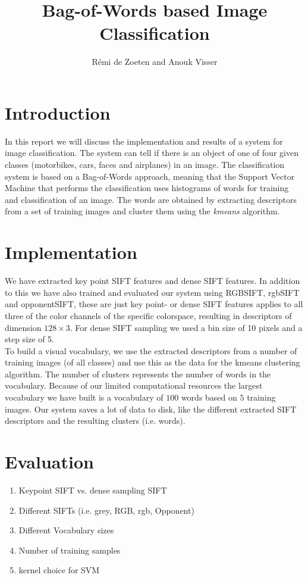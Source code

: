 \documentclass[11pt]{article}
\title{Bag-of-Words based Image Classification}
\author{R\'emi de Zoeten and Anouk Visser}
\begin{document}
\maketitle
\section{Introduction}
In this report we will discuss the implementation and results of a system for image classification. The system can tell if there is an object of one of four given classes (motorbikes, cars, faces and airplanes) in an image. The classification system is based on a Bag-of-Words approach, meaning that the Support Vector Machine that performs the classification uses histograms of words for training and classification of an image. The words are obtained by extracting descriptors from a set of training images and cluster them using the \textit{kmeans} algorithm.  

\section{Implementation}
We have extracted key point SIFT features and dense SIFT features. In addition to this we have also trained and evaluated our system using RGBSIFT, rgbSIFT and opponentSIFT, these are just key point- or dense SIFT features applies to all three of the color channels of the specific colorspace, resulting in descriptors of dimension $128\times3$. For dense SIFT sampling we used a bin size of 10 pixels and a step size of 5. \\
To build a visual vocabulary, we use the extracted descriptors from a number of training images (of all classes) and use this as the data for the kmeans clustering algorithm. The number of clusters represents the number of words in the vocabulary. Because of our limited computational resources the largest vocabulary we have built is a vocabulary of $100$ words based on $5$ training images. Our system saves a lot of data to disk, like the different extracted SIFT descriptors and the resulting clusters (i.e. words). 
\section{Evaluation}
\begin{enumerate}
\item Keypoint SIFT vs. dense sampling SIFT
\item Different SIFTs (i.e. grey, RGB, rgb, Opponent)
\item Different Vocabulary sizes
\item Number of training samples
\item kernel choice for SVM
\end{enumerate}
\end{document}
